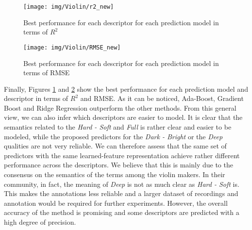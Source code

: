 \begin{figure}[t]
	\centering
	\texttt{[image: img/Violin/r2\_new]}%
	\caption{Best performance for each descriptor for each prediction model in terms of $R^2$}
	\label{fig:Violin:R2}
\end{figure}


\begin{figure}[t]
	\centering
	\texttt{[image: img/Violin/RMSE\_new]}%
	\caption{Best performance for each descriptor for each prediction model in terms of RMSE}
	\label{fig:Violin:RMSE}
\end{figure}

Finally, Figures \ref{fig:Violin:R2} and \ref{fig:Violin:RMSE} show the best performance for each prediction model and descriptor in terms of $R^2$ and RMSE. As it can be noticed, Ada-Boost, Gradient Boost and Ridge Regression outperform the other methods. From this general view, we can also infer which descriptors are easier to model. It is clear that the semantics related to the \textit{Hard - Soft} and \textit{Full} is rather clear and easier to be modeled, while the proposed predictors for the \textit{Dark - Bright} or the \textit{Deep} qualities are not very reliable. We can therefore assess that the same set of predictors with the same learned-feature representation achieve rather different performance across the descriptors. We believe that this is mainly due to the consensus on the semantics of the terms among the violin makers. In their community, in fact, the meaning of \textit{Deep} is not as much clear as \textit{Hard - Soft} is. This makes the annotations less reliable and a larger dataset of recordings and annotation would be required for further experiments. However, the overall accuracy of the method is promising and some descriptors are predicted with a high degree of precision.


%
%

